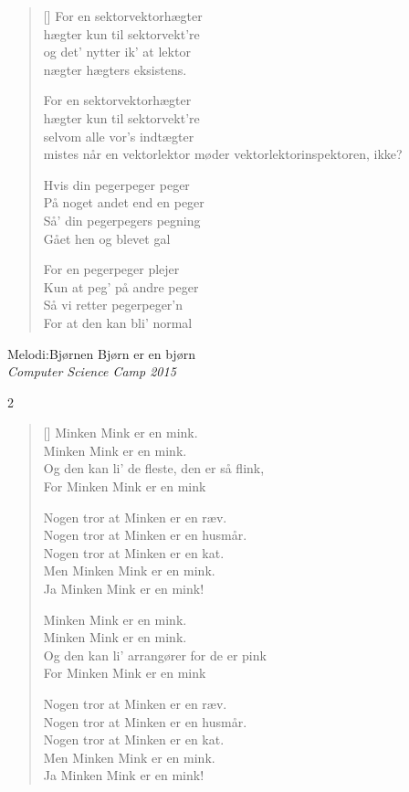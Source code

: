\begin{multicols}
\begin{verse}[\versewidth]
For en sektorvektorhægter\\
hægter kun til sektorvekt're\\
og det' nytter ik' at lektor\\
nægter hægters eksistens.

For en sektorvektorhægter\\
hægter kun til sektorvekt're\\
selvom alle vor's indtægter\\
mistes når en vektorlektor møder vektorlektorinspektoren, ikke?

Hvis din pegerpeger peger\\
På noget andet end en peger\\
Så' din pegerpegers pegning\\
Gået hen og blevet gal

For en pegerpeger plejer\\
Kun at peg' på andre peger\\
Så vi retter pegerpeger'n\\
For at den kan bli' normal
\end{verse}
\end{multicols}

{Melodi:Bjørnen Bjørn er en bjørn}\\[.2em]
{\small\itshape Computer Science Camp 2015}
\begin{multicols}2
\settowidth{\versewidth}{Med disse ord skal sandhed skrives (Sandhed skrives)}
\begin{verse}[\versewidth]
Minken Mink er en mink.\\
Minken Mink er en mink.\\
Og den kan li' de fleste, den er så flink,\\
For Minken Mink er en mink

Nogen tror at Minken er en ræv.\\
Nogen tror at Minken er en husmår.\\
Nogen tror at Minken er en kat.\\
Men Minken Mink er en mink.\\
Ja Minken Mink er en mink!

Minken Mink er en mink.\\
Minken Mink er en mink.\\
Og den kan li' arrangører for de er pink\\
For Minken Mink er en mink

Nogen tror at Minken er en ræv.\\
Nogen tror at Minken er en husmår.\\
Nogen tror at Minken er en kat.\\
Men Minken Mink er en mink.\\
Ja Minken Mink er en mink!

\end{verse}
\end{multicols}

